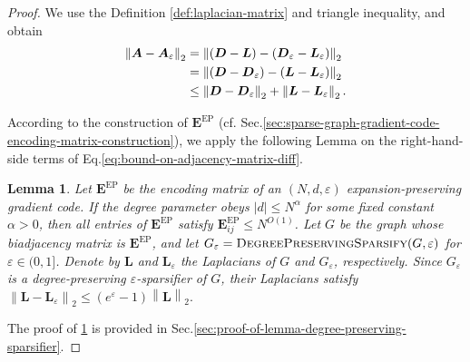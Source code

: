 \documentclass[lettersize,journal]{IEEEtran}
\newcommand{\adj}{\a}
\renewcommand{\deg}{\boldsymbol{D}}
\newcommand{\lap}{\boldsymbol{L}}
\renewcommand{\v}{\boldsymbol{v}}
\newcommand{\norm}[1]{\left\lVert#1\right\rVert}
\newcommand{\ones}[1]{\boldsymbol{1}_{#1}}
\newcommand{\F}{\mathcal{F}}
\newcommand{\GEP}{\boldsymbol{E}^{\mathrm{EP}}}
\renewcommand{\a}{\boldsymbol{a}}
\renewcommand{\adj}{\boldsymbol{A}}
\newtheorem{lemma}{Lemma}
\begin{document}
{\begin{proof}
We use the Definition \ref{def:laplacian-matrix} and triangle inequality, and obtain 
\begin{align}
    \norm{\adj - \adj_\varepsilon}_2 &= \norm{(\deg-\lap) - (\deg_\varepsilon - \lap_\varepsilon)}_2\notag\\
    &= \norm{(\deg - \deg_\varepsilon) - (\lap - \lap_\varepsilon)}_2 \notag\\
    &\leq  \norm{\deg - \deg_\varepsilon}_2 + \norm{\lap -\lap_\varepsilon}_2.
    \label{eq:bound-on-adjacency-matrix-diff}
\end{align}

According to the construction of $\GEP$ (cf. Sec.\ref{sec:sparse-graph-gradient-code-encoding-matrix-construction}), we apply the following Lemma on the right-hand-side terms of Eq.\eqref{eq:bound-on-adjacency-matrix-diff}.

\begin{lemma}
\label{lemma:degree-preserving-sparsifier}
Let $\GEP$ be the encoding matrix of an $(N,d,\varepsilon)$ expansion-preserving gradient code. If the degree parameter obeys $|d| \le N^\alpha$ for some fixed constant $\alpha>0$, then all entries of $\GEP$ satisfy 
$\GEP_{ij} \le N^{O(1)}$. 
Let $G$ be the graph whose biadjacency matrix is $\GEP$, and let $G_\varepsilon=\textsc{DegreePreservingSparsify}(G,\varepsilon)$ for $ \varepsilon\in(0,1]$.
Denote by $\lap$ and $\lap_\varepsilon$ the Laplacians of $G$ and $G_\varepsilon$, respectively.  
Since $G_\varepsilon$ is a degree-preserving $\varepsilon$-sparsifier of $G$, their Laplacians satisfy
$    \norm{\lap - \lap_\varepsilon}_2 \le (e^\varepsilon-1) \norm{\lap}_2.$
\end{lemma} 
The proof of \ref{lemma:degree-preserving-sparsifier} is provided in Sec.\ref{sec:proof-of-lemma-degree-preserving-sparsifier}.


\end{proof}}
\end{document}
